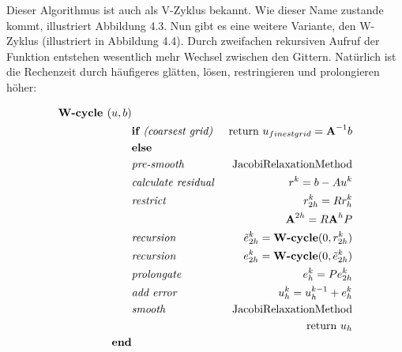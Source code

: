 Dieser Algorithmus ist auch als V-Zyklus bekannt. Wie dieser Name zustande kommt, illustriert Abbildung 4.3. Nun gibt es eine weitere Variante, den W-Zyklus (illustriert in Abbildung 4.4). Durch zweifachen rekursiven Aufruf der Funktion entstehen wesentlich mehr Wechsel zwischen den Gittern. Natürlich ist die Rechenzeit durch häufigeres glätten, lösen, restringieren und prolongieren höher:

\begin{eqnarray}
\textbf{W-cycle }(u,b)                         & \notag \\
&\textbf{if }\textit{(coarsest grid) }&\textnormal{return } u_{finest grid}={\textbf{A}}^{-1}b \notag \\
&\textbf{else }                                                & \notag \\
&\textit{pre-smooth }                                 &\textnormal{JacobiRelaxationMethod} \notag \\
&\textit{calculate residual }                &r^{k} = b - Au^{k} \notag \\
&\textit{restrict }                                 &r^{k}_{2h}=Rr^{k}_{h} \notag \\
&                                                                        &{\textbf{A}}^{2h} = R{\textbf{A}}^{h}P \notag \\
&\textit{recursion }                                &\tilde e^{k}_{2h} = \textbf{W-cycle}(0,r^{k}_{2h}) \notag \\
&\textit{recursion }                                &e^{k}_{2h} = \textbf{W-cycle}(0,\tilde e^{k}_{2h}) \notag \\
&\textit{prolongate }                                &e^{k}_{h} = Pe^{k}_{2h} \notag \\
&\textit{add error }                                &u^{k}_{h} = u^{k-1}_{h} + e^{k}_{h} \notag \\
&\textit{smooth }                                        &\textnormal{JacobiRelaxationMethod} \notag \\
&                                                                        &\textnormal{return } u_{h} \notag \\
\textbf{end}                                                & \notag
\end{eqnarray}

 \label{W-Cycle}

